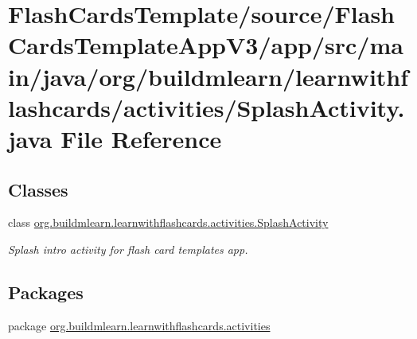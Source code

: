 \hypertarget{FlashCardsTemplate_2source_2FlashCardsTemplateAppV3_2app_2src_2main_2java_2org_2buildmlearn_2leac158be61e5aedf6ffe06f9a79f14f075}{}\section{Flash\+Cards\+Template/source/\+Flash\+Cards\+Template\+App\+V3/app/src/main/java/org/buildmlearn/learnwithflashcards/activities/\+Splash\+Activity.java File Reference}
\label{FlashCardsTemplate_2source_2FlashCardsTemplateAppV3_2app_2src_2main_2java_2org_2buildmlearn_2leac158be61e5aedf6ffe06f9a79f14f075}
\subsection*{Classes}
\begin{DoxyCompactItemize}
\item 
class \hyperlink{classorg_1_1buildmlearn_1_1learnwithflashcards_1_1activities_1_1SplashActivity}{org.\+buildmlearn.\+learnwithflashcards.\+activities.\+Splash\+Activity}
\begin{DoxyCompactList}\small\item\em Splash intro activity for flash card template\textquotesingle{}s app. \end{DoxyCompactList}\end{DoxyCompactItemize}
\subsection*{Packages}
\begin{DoxyCompactItemize}
\item 
package \hyperlink{namespaceorg_1_1buildmlearn_1_1learnwithflashcards_1_1activities}{org.\+buildmlearn.\+learnwithflashcards.\+activities}
\end{DoxyCompactItemize}
